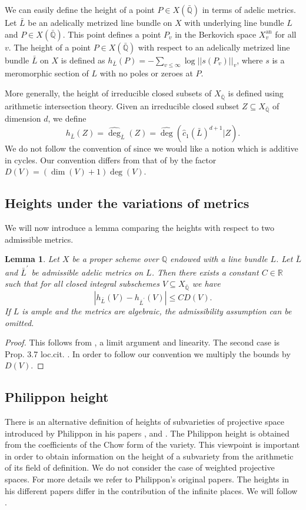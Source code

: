\documentclass[11pt, a4paper, UKenglish]{amsart}
\newcommand{\Q}{\mathbb{Q}}
\newcommand{\Qbar}{\bar{\mathbb{Q}}}
\newcommand{\bbR}{\mathbb{R}}
\DeclareMathOperator{\an}{an}
\newcommand{\eqn}[1]{\begin{equation*}#1\end{equation*}}
\newtheorem{lemma_}[thm_]{Lemma}
\theoremstyle{definition}
\newcommand{\lemm}[1]{\begin{lemma_}#1\end{lemma_}}
\newcommand{\pf}[1]{\begin{proof}#1\end{proof}}
\begin{document}
We can easily define the height of a point $P \in X(\Qbar)$ in terms of adelic metrics. Let $\bar{L}$ be an adelically metrized line bundle on $X$ with underlying line bundle $L$ and $P \in X(\Qbar)$. This point defines a point $P_v$ in the Berkovich space $X^{\an}_v$ for all $v$. The height of a point $P \in X(\Qbar)$ with respect to an adelically metrized line bundle $\bar{L}$ on $X$ is defined as $h_{\bar{L}}(P) = -\sum_{v \leq \infty} \log||s(P_v)||_v$, where $s$ is a meromorphic section of $L$ with no poles or zeroes at $P$.

More generally, the height of irreducible closed subsets of $X_{\Qbar}$ is defined using arithmetic intersection theory. Given an irreducible closed subset $Z \subseteq X_{\Qbar}$ of dimension $d$, we define
\eqn{h_{\bar{L}}(Z) = \widehat{\deg}_{\bar{L}}(Z)= \widehat{\deg}(\hat{c}_1(\bar{L})^{d+1}|Z).}
We do not follow the convention of \cite{cl} since we would like a notion which is additive in cycles. Our convention differs from that of \cite{cl} by the factor $D(V)= (\dim(V) + 1)\deg(V)$.


\subsection{Heights under the variations of metrics}

We will now introduce a lemma comparing the heights with respect to two admissible metrics.

\lemm{\label{arcomp}Let $X$ be a proper scheme over $\Q$ endowed with a line bundle $L$. Let $\bar{L}$ and $\bar{L}^\prime$ be admissible adelic metrics on $L$. Then there exists a constant $C \in \bbR$ such that for all closed integral subschemes $V \subseteq X_{\Qbar}$ we have
\eqn{|h_{\bar{L}}(V)-h_{\bar{L}^{\prime}}(V)| \leq CD(V).} 
If $L$ is ample and the metrics are algebraic, the admissibility assumption can be omitted.}

\pf{This follows from \cite[Prop. 5.3.]{cl}, a limit argument and linearity. The second case is Prop. 3.7 loc.cit. . In order to follow our convention we multiply the bounds by $D(V)$.}

\subsection{Philippon height}

There is an alternative definition of heights of subvarieties of projective space introduced by Philippon in his papers \cite{phil1}, \cite{phil2} and \cite{phil3}. The Philippon height is obtained from the coefficients of the Chow form of the variety. This viewpoint is important in order to obtain information on the height of a subvariety from the arithmetic of its field of definition. We do not consider the case of weighted projective spaces. For more details we refer to Philippon's original papers. The heights in his different papers differ in the contribution of the infinite places. We will follow \cite{phil3}.
\end{document}
